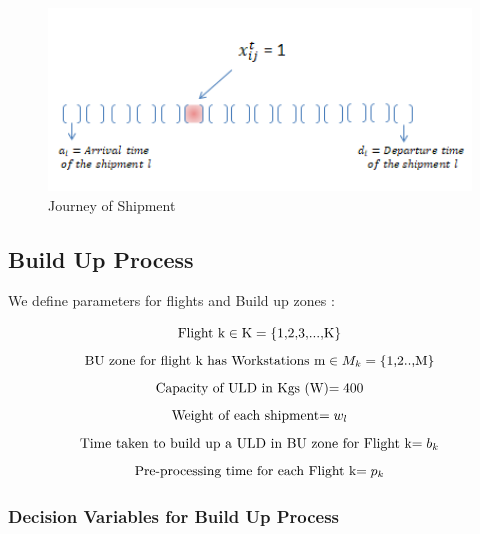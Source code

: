 \documentclass[11pt,a4paper,fleqn]{article}
\begin{document}
\begin{figure}[hbt!]
	\centering
	\includegraphics[width=130mm,scale=1.5]{Marco.png}
	\caption{Journey of Shipment}
	\label{fig:Journey of Shipment}
\end{figure}

\subsection{Build Up Process}
\label{sec:ParamBUZone}

We define parameters for flights and Build up zones :

\begin{equation*} ${\color{black} Flight k}$ {}  \in {}  ${\color{black}K}$ {} = {} ${\color{black}\{1,2,3,...,K\}}$  \end{equation*} 
\begin{equation*} ${\color{black} BU zone for flight k has Workstations m}$ {}  \in {}  M_k {} = {} ${\color{black}\{1,2..,M\}}$  \end{equation*}
\begin{equation*} ${\color{black} Capacity of ULD in Kgs (W)}$  = 400 \end{equation*}
\begin{equation*} ${\color{black} Weight of each shipment}$  = w_l \end{equation*}
\begin{equation*} ${\color{black} Time taken to build up a ULD in BU zone for Flight k}$  = b_k \end{equation*}
\begin{equation*} ${\color{black} Pre-processing time for each Flight k}$  = p_k \end{equation*}

\subsubsection{Decision Variables for Build Up Process}
\label{sec:DVBDZone}
\end{document}
